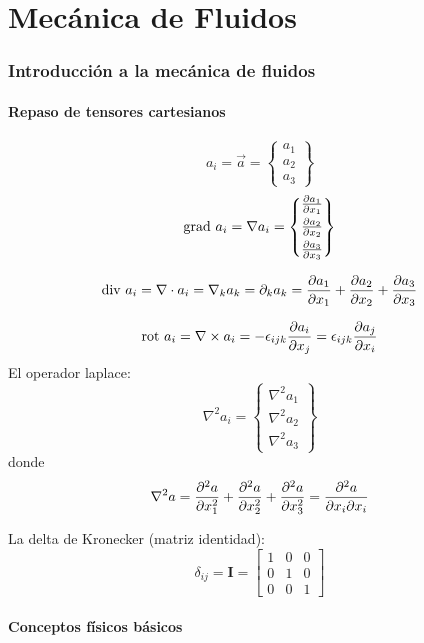 
\part{Mecánica de Fluidos}
\section{Introducción a la mecánica de fluidos}
\subsection{Repaso de tensores cartesianos}
\[
a_i =\vec{a}= \begin{Bmatrix}
a_1 \\
a_2 \\
a_3
\end{Bmatrix}%
\]
\[
\gradient a_i=\nabla a_i = 
\begin{Bmatrix}
\vspace{.1cm}\spartial{a_1}{x_1} \\
\vspace{.1cm}\spartial{a_2}{x_2} \\
\spartial{a_3}{x_3}
\end{Bmatrix}%
\]

\[
\textrm{div } a_i = \nabla \cdot a_i=\nabla_k a_k=\partial_k a_k =\frac{\partial a_1}{\partial x_1}+\frac{\partial a_2}{\partial x_2}+\frac{\partial a_3}{\partial x_3}
\]

\[
\textrm{rot } a_i = \nabla \times a_i  = -\epsilon_{ijk} \frac{\partial a_i}{\partial x_j}= \epsilon_{ijk} \frac{\partial a_j}{\partial x_i}
\]
El operador laplace:
\[
\nabla^2 a_i= \begin{Bmatrix}
\nabla^2 a_1 \\
\nabla^2 a_2 \\
\nabla^2 a_3
\end{Bmatrix} 
\]
donde
\[
\nabla^2 a = \frac{\partial^2 a}{\partial x_1 ^2}+\frac{\partial^2 a}{\partial x_2 ^2}+\frac{\partial^2 a}{\partial x_3 ^2}=\frac{\partial^2 a}{\partial x_i \partial x_i} 
\]

La delta de Kronecker (matriz identidad):
\[
\delta_{ij}=\mathbf{I}=\begin{bmatrix}
1 & 0& 0\\
0 & 1 & 0\\
0 & 0 &1
\end{bmatrix}
\]
\subsection{Conceptos físicos básicos}
